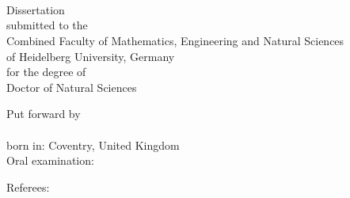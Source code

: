 %
\begin{titlepage}
	\tgherosfont
	\centering

	\vspace*{\fill}
	{\large \thesisUniversity} \\[5mm]
	{\LARGE \color{ctcolortitle}\textbf{\thesisTitle} \\[10mm]}
	{\Large \thesisName} \\
	\vspace*{\fill}


\end{titlepage}

\begin{titlepage}
	\centering
	Dissertation\\[5mm]
	submitted to the\\
	Combined Faculty of Mathematics, Engineering and Natural Sciences\\
	of Heidelberg University, Germany\\
	for the degree of\\[5mm]
	Doctor of Natural Sciences\\

	\hfill
	\vfill

	Put forward by\\[5mm]
	\thesisName\\
	born in: Coventry, United Kingdom\\[5mm]
	Oral examination: \thesisExamDate\\

\end{titlepage}

\begin{titlepage}
	\centering
	{\Large \thesisTitle}
	\hfill
	\vfill

	\begin{minipage}[t]{.3\textwidth}
		\raggedleft
		Referees:
	\end{minipage}
	\hspace*{.1\textwidth}
	\begin{minipage}[t]{.585\textwidth}
		{\thesisFirstReviewer} \\
		{\thesisSecondReviewer} \\
	\end{minipage} \\[5mm]

	\newpage
\end{titlepage}


